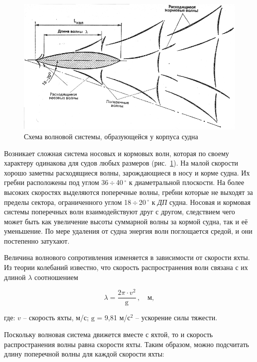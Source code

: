 \documentclass[a4paper, 12pt, twoside, final, book, russian, fittopage, cyremdash]{ncc}
\newcommand{\gr}{\ensuremath{\,^\circ}\xspace}
\newcommand{\otdo}{\,\ensuremath{\div}\,}
\newcommand{\ris}[1]{\ref{fig:#1}}
\begin{document}
\begin{figure}[htb]
  \centering
  \includegraphics[scale=1.3]{0016P.pdf}
  \caption{Схема волновой системы, образующейся у корпуса судна}
  \label{fig:16}
\end{figure}

Возникает сложная система носовых и кормовых волн, которая по своему характеру одинакова для судов любых размеров (рис.~\ris{16}). На малой скорости хорошо заметны расходящиеся волны, зарождающиеся в носу и корме судна. Их гребни расположены под углом 36\otdo 40\gr к диаметральной плоскости. На более высоких скоростях выделяются поперечные волны, гребни которые не выходят за пределы сектора, ограниченного углом 18\otdo 20\gr к \textit{ДП} судна. Носовая и кормовая системы поперечных волн взаимодействуют друг с другом, следствием чего может быть как увеличение высоты суммарной волны за кормой судна, так и её уменьшение. По мере удаления от судна энергия волн поглощается средой, и они постепенно затухают.

Величина волнового сопротивления изменяется в зависимости от скорости яхты. Из теории колебаний известно, что скорость распространения волн связана с их длиной $\lambda$ соотношением

\begin{equation}
  \lambda = \frac{2 \pi \cdot v^2}{\mathrm g}\,, \quad \text{м},
\end{equation}

где: $v$ \--- скорость яхты, м/с; $\mathrm g$ = 9,81 м/с$^2$ \--- ускорение силы тяжести. 

Поскольку волновая система движется вместе с яхтой, то и скорость распространения волны равна скорости яхты. Таким образом, можно подсчитать длину поперечной волны для каждой скорости яхты:
\end{document}
